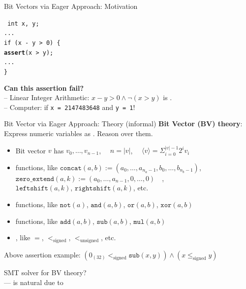 \documentclass[t,english]{sdqbeamer}
\begin{document}
\begin{frame}{Bit Vectors via Eager Approach: Motivation}
	
	\begin{center}
		\begin{minipage}{0.25\textwidth}
			\texttt{%
				int x, y;\\
				...\\
				if (x - y > 0) \{\\
				\hspace*{5mm}\textbf{assert}(x > y);\\
				\hspace*{5mm}...\\
				\}\\
			}
		\end{minipage}		
	\end{center}
	
	\textbf{Can this assertion fail?} \pause
	\\ -- Linear Integer Arithmetic: $x-y > 0 \wedge \neg(x > y)$ is . \pause
	\\ -- Computer:  if \texttt{x = 2147483648} and \texttt{y = 1}!
\end{frame}

\begin{frame}{Bit Vector via Eager Approach: Theory (informal)}
	\textbf{Bit Vector (BV) theory}: Express numeric variables as . Reason over them.
	\begin{itemize}
		\item Bit vector $v$ has  $v_0,\ldots,v_{n-1}$,\ \  $n = |v|$,\ \  $\langle v \rangle = \Sigma_{i=0}^{|v|-1} 2^i v_i$
		\item {} functions, like $\texttt{concat}(a, b) := (a_0,\ldots,a_{n_a-1},b_0,\ldots,b_{n_b-1})$,\\
		$\texttt{zero\_extend}(a, k) := (a_0,\ldots,a_{n-1},0,\ldots,0)$\ \ ,\\
		$\texttt{leftshift}(a, k)$, $\texttt{rightshift}(a, k)$, etc.
		\item {} functions, like $\texttt{not}(a)$, $\texttt{and}(a,b)$, $\texttt{or}(a,b)$, $\texttt{xor}(a,b)$
		\item {} functions, like $\texttt{add}(a,b)$, $\texttt{sub}(a,b)$, $\texttt{mul}(a,b)$
		\item {}, like $=$, $<_{\textrm{signed}}$, $<_{\textrm{unsigned}}$, etc.
	\end{itemize}
	
	\vspace*{3mm}
	Above assertion example: $(0_{(32)} <_{\textrm{signed}} \texttt{sub}(x,y)) \wedge (x \leq_{\textrm{signed}} y)$
	
	\vspace*{3mm}
	SMT solver for BV theory?\\
	---  is natural due to 
\end{frame}
\end{document}

